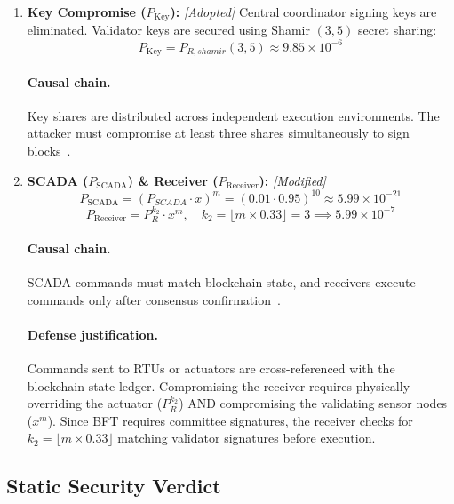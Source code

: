 \documentclass[10pt,twocolumn,journal]{IEEEtran}
\begin{document}
\begin{enumerate}[leftmargin=*]
    \item \textbf{Key Compromise ($P_{\mathrm{Key}}$):} \emph{[Adopted]} Central coordinator signing keys are eliminated. Validator keys are secured using Shamir $(3,5)$ secret sharing:
    \begin{equation}
    \label{eq:key_bc}
    P_{\mathrm{Key}} = P_{R,shamir}(3,5) \approx 9.85 \times 10^{-6}
    \end{equation}
    \paragraph{Causal chain.} Key shares are distributed across independent execution environments. The attacker must compromise at least three shares simultaneously to sign blocks~\cite{sridhar2012}.

    \item \textbf{SCADA ($P_{\mathrm{SCADA}}$) \& Receiver ($P_{\mathrm{Receiver}}$):} \emph{[Modified]}
    \begin{equation}
    \label{eq:scada_bc}
    P_{\mathrm{SCADA}} = (P_{SCADA} \cdot x)^m = (0.01 \cdot 0.95)^{10} \approx 5.99 \times 10^{-21}
    \end{equation}
    \begin{equation}
    \label{eq:receiver_bc}
    P_{\mathrm{Receiver}} = P_R^{k_2} \cdot x^m, \quad k_2 = \lfloor m \times 0.33 \rfloor = 3 \implies 5.99 \times 10^{-7}
    \end{equation}
    \paragraph{Causal chain.} SCADA commands must match blockchain state, and receivers execute commands only after consensus confirmation~\cite{sheikh2020}.
    \paragraph{Defense justification.} Commands sent to RTUs or actuators are cross-referenced with the blockchain state ledger. Compromising the receiver requires physically overriding the actuator ($P_R^{k_2}$) AND compromising the validating sensor nodes ($x^m$). Since BFT requires committee signatures, the receiver checks for $k_2 = \lfloor m \times 0.33 \rfloor$ matching validator signatures before execution.
\end{enumerate}

\subsection{Static Security Verdict}
\label{sec:static_verdict}
\end{document}
